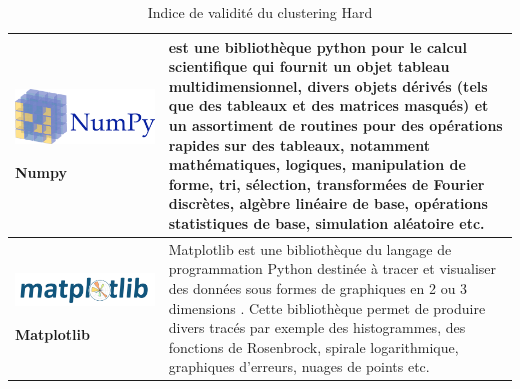 \begin{table}[H]
\begin{tabular}{|m{5cm}|m{14cm}|}
  \begin{center}
	    \begin{minipage}{.3\textwidth}
      \includegraphics[width=\textwidth]{images/chapitre7/numpy.png}
    \end{minipage}
	\end{center}
	\centering \textbf{Numpy} \cite{2020NumPy-Array} & est une bibliothèque python pour le calcul scientifique qui fournit un objet tableau multidimensionnel, divers objets dérivés (tels que des tableaux et des matrices masqués) et un assortiment de routines pour des opérations rapides sur des tableaux, notamment mathématiques, logiques, manipulation de forme, tri, sélection, transformées de Fourier discrètes, algèbre linéaire de base, opérations statistiques de base, simulation aléatoire etc.  \\ \hline
  \begin{center}
    \begin{minipage}{.3\textwidth}
    \includegraphics[width=\textwidth]{images/chapitre7/matplotlib.png}
  \end{minipage}
  \end{center}
  \centering \textbf{Matplotlib} \cite{hunter2007matplotlib} & Matplotlib est une bibliothèque du langage de programmation Python destinée à tracer et visualiser des données sous formes de graphiques en 2 ou 3 dimensions \cite{tosi2009matplotlib}. Cette bibliothèque permet de produire divers tracés par exemple des histogrammes, des fonctions de Rosenbrock, spirale logarithmique, graphiques d'erreurs, nuages de points etc.  \\ \hline

  \end{tabular}
	\caption{Indice de validité du clustering Hard}
	\label{tools}
\end{table}

